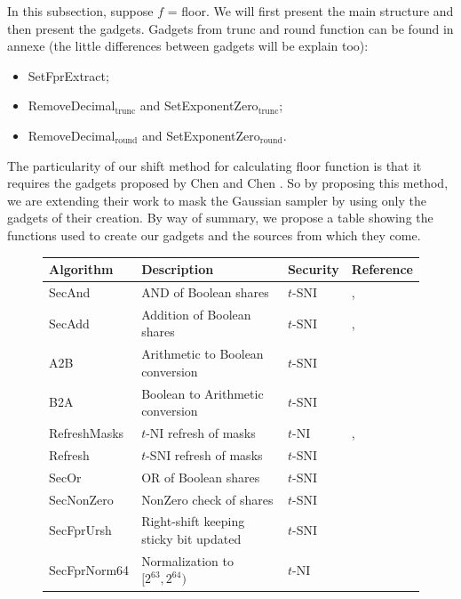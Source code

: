 \documentclass[runningheads]{llncs}
\begin{document}
    In this subsection, suppose $f$ = floor. We will first present the main structure and then present the gadgets. Gadgets from trunc and round function can be found in annexe (the little differences between gadgets will be explain too):
    \begin{itemize}%
        \item SetFprExtract;
        \item RemoveDecimal$_\text{trunc}$ and SetExponentZero$_\text{trunc}$;
        \item RemoveDecimal$_\text{round}$ and SetExponentZero$_\text{round}$.
    \end{itemize}
    The particularity of our shift method for calculating floor function is that it requires the gadgets proposed by Chen and Chen \cite{Chen_Chen_2024}. So by proposing this method, we are extending their work to mask the Gaussian sampler by using only the gadgets of their creation.
    By way of summary, we propose a table showing the functions used to create our gadgets and the sources from which they come.

    \begin{figure}[!ht]
        \begin{center}
            \begin{tabular}{C{2.5 cm} || C{6 cm} C{1.2cm} C{2cm}}
              \toprule
               \textbf{Algorithm} & \textbf{Description} & \textbf{Security} & \textbf{Reference}\\
                \midrule
                 SecAnd   & AND of Boolean shares             & $t$-SNI &  \cite{ishai2003private}, \cite{barthe2016strong}\\
                 SecAdd         & Addition of Boolean shares        & $t$-SNI&  \cite{coron2015conversion}, \cite{barthe2018masking}\\
                 A2B            & Arithmetic to Boolean conversion  & $t$-SNI& \cite{schneider2019efficiently}\\
                 B2A            & Boolean to Arithmetic conversion  & $t$-SNI&  \cite{bettale2018improved}\\
                 RefreshMasks   & $t$-NI refresh of masks           & $t$-NI&  \cite{barthe2016strong}, \cite{bettale2018improved}\\
                 Refresh        & $t$-SNI refresh of masks          & $t$-SNI& \cite{barthe2016strong}\\
                 SecOr          & OR of Boolean shares              & $t$-SNI&  \cite{Chen_Chen_2024}\\
                 SecNonZero     & NonZero check of shares           & $t$-SNI&  \cite{Chen_Chen_2024}\\
                 SecFprUrsh     & Right-shift keeping sticky bit updated  & $t$-SNI&  \cite{Chen_Chen_2024}\\
                 SecFprNorm64   & Normalization to $[2^{63},2^{64})$ & $t$-NI& \cite{Chen_Chen_2024}\\
                \bottomrule
            \end{tabular}
        \end{center}
    \end{figure}
\end{document}

